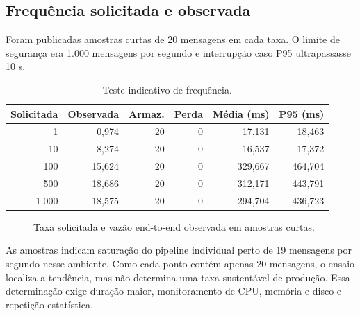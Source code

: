 \documentclass[12pt,a4paper]{article}
\begin{document}
\subsection{Frequência solicitada e observada}

Foram publicadas amostras curtas de 20 mensagens em cada taxa. O limite de segurança era 1.000 mensagens por segundo e interrupção caso P95 ultrapassasse 10 s.

\begin{table}[htbp]
\centering
\caption{Teste indicativo de frequência.}
\begin{tabular}{rrrrrr}
\toprule
Solicitada & Observada & Armaz. & Perda & Média (ms) & P95 (ms) \\
\midrule
1 & 0,974 & 20 & 0 & 17,131 & 18,463 \\
10 & 8,274 & 20 & 0 & 16,537 & 17,372 \\
100 & 15,624 & 20 & 0 & 329,667 & 464,704 \\
500 & 18,686 & 20 & 0 & 312,171 & 443,791 \\
1.000 & 18,575 & 20 & 0 & 294,704 & 436,723 \\
\bottomrule
\end{tabular}
\end{table}

\begin{figure}[htbp]
\centering
{}
\caption{Taxa solicitada e vazão end-to-end observada em amostras curtas.}
\end{figure}

As amostras indicam saturação do pipeline individual perto de 19 mensagens por segundo nesse ambiente. Como cada ponto contém apenas 20 mensagens, o ensaio localiza a tendência, mas não determina uma taxa sustentável de produção. Essa determinação exige duração maior, monitoramento de CPU, memória e disco e repetição estatística.
\end{document}
